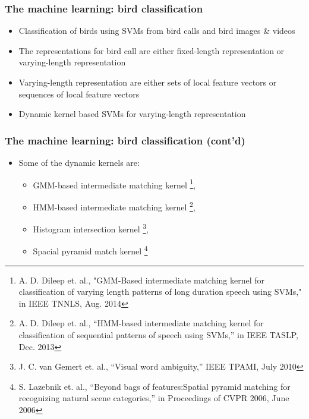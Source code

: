 \documentclass[mathserif]{beamer}
\begin{document}
\begin{frame}
\frametitle{The machine learning: bird classification}
\begin{itemize}
\item<2-> Classification of birds using SVMs from bird calls and bird images \& videos
\item<3-> The representations for bird call are either fixed-length
representation or varying-length representation
\item<4-> Varying-length representation are either sets of local feature vectors or sequences of local feature vectors
\item<5-> Dynamic kernel based SVMs for varying-length representation
\end{itemize}
\end{frame}

\begin{frame}
\frametitle{The machine learning: bird classification (cont'd)}
\begin{itemize}
\item<2-> Some of the dynamic kernels are:
\begin{itemize}
	\item GMM-based intermediate matching kernel \footnote{
	A. D. Dileep et. al., "GMM-Based intermediate matching kernel for
	classification of varying length patterns of long duration speech using SVMs," in IEEE TNNLS, Aug. 2014},
	\item HMM-based intermediate matching kernel \footnote{A. D. Dileep et. al., “HMM-based intermediate matching kernel for classification of sequential patterns of speech using SVMs,” in IEEE TASLP, Dec. 2013}, 
	\item Histogram intersection kernel \footnote{J. C. van Gemert et. al., “Visual word ambiguity,” IEEE TPAMI, July 2010}, 
	\item Spacial pyramid match kernel \footnote{S. Lazebnik et. al., “Beyond bags of features:Spatial pyramid matching for recognizing natural scene categories,” in Proceedings of CVPR 2006, June 2006}
\end{itemize}
\end{itemize}
\end{frame}
\end{document}
